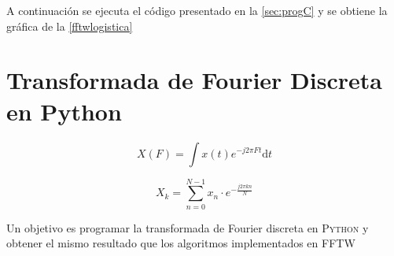 \documentclass[letterpaper,11pt]{article}
\begin{document}
A continuación se ejecuta el código presentado en la \autoref{sec:progC} y se obtiene la gráfica de la \autoref{fftwlogistica}
\FloatBarrier

\section{Transformada de Fourier Discreta en Python}
\label{sec:TFP}

\begin{equation}
	X(F) = \int x(t) e^{ -j 2 \pi F t  } \mathrm d t
	\label{eq:continua}
\end{equation}

\begin{equation}
	X_k = \sum_{n=0}^{N-1} x_n \cdot e^{-\frac{j2\pi k n}{N}}
	\label{eq:discreta}
\end{equation}

Un objetivo es programar la transformada de Fourier discreta en \textsc{Python} y obtener el mismo resultado que los algoritmos implementados en FFTW





\end{document}

